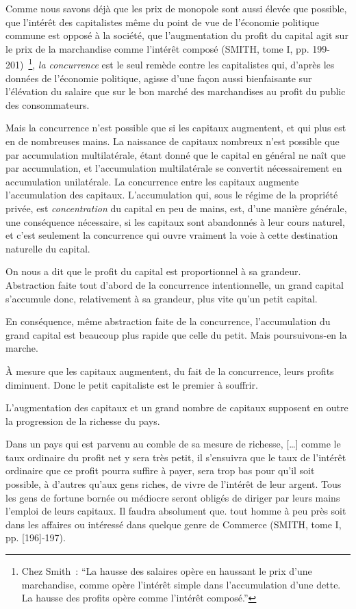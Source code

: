 \documentclass[french,twoside]{book} %
\newenvironment{quoteblock}%
  {\begin{quoting}}
  {\end{quoting}}
\newenvironment{quotebar}{%
    \def\FrameCommand{{\color{rubric!10!}\vrule width 0.5em} \hspace{0.9em}}%
    \def\OuterFrameSep{\itemsep} %
    \MakeFramed {\advance\hsize-\width \FrameRestore}
  }%
  {%
    \endMakeFramed
  }
\renewenvironment{quoteblock}%
  {%
    \savenotes
    \setstretch{0.9}
    \normalfont
    \begin{quotebar}
  }
  {%
    \end{quotebar}
    \spewnotes
  }
\begin{document}
\noindent Comme nous savons déjà que les prix de monopole sont aussi élevée que possible, que l’intérêt des capitalistes même du point de vue de l’économie politique commune est opposé à la société, que l’augmentation du profit du capital agit sur le prix de la marchandise comme l’intérêt composé (SMITH, tome I, pp. 199-201) \footnote{Chez Smith : “La hausse des salaires opère en haussant le prix d’une marchandise, comme opère l’intérêt simple dans l’accumulation d’une dette. La hausse des profits opère comme l’intérêt composé.”}, \emph{la concurrence} est le seul remède contre les capitalistes qui, d’après les données de l’économie politique, agisse d’une façon aussi bienfaisante sur l’élévation du salaire que sur le bon marché des marchandises au profit du public des consommateurs.\par
Mais la concurrence n’est possible que si les capitaux augmentent, et qui plus est en de nombreuses mains. La naissance de capitaux nombreux n’est possible que par accumulation multilatérale, étant donné que le capital en général ne naît que par accumulation, et l’accumulation multilatérale se convertit nécessairement en accumulation unilatérale. La concurrence entre les capitaux augmente l’accumulation des capitaux. L’accumulation qui, sous le régime de la propriété privée, est \emph{concentration} du capital en peu de mains, est, d’une manière générale, une conséquence nécessaire, si les capitaux sont abandonnés à leur cours naturel, et c’est seulement la concurrence qui ouvre vraiment la voie à cette destination naturelle du capital.\par
On nous a dit que le profit du capital est proportionnel à sa grandeur. Abstraction faite tout d’abord de la concurrence intentionnelle, un grand capital s’accumule donc, relativement à sa grandeur, plus vite qu’un petit capital.\par
[VIII] En conséquence, même abstraction faite de la concurrence, l’accumulation du grand capital est beaucoup plus rapide que celle du petit. Mais poursuivons-en la marche.\par
À mesure que les capitaux augmentent, du fait de la concurrence, leurs profits diminuent. Donc le petit capitaliste est le premier à souffrir.\par
L’augmentation des capitaux et un grand nombre de capitaux supposent en outre la progression de la richesse du pays.\par

\begin{quoteblock}
 \noindent Dans un pays qui est parvenu au comble de sa mesure de richesse, […] comme le taux ordinaire du profit net y sera très petit, il s’ensuivra que le taux de l’intérêt ordinaire que ce profit pourra suffire à payer, sera trop bas pour qu’il soit possible, à d’autres qu’aux gens riches, de vivre de l’intérêt de leur argent. Tous les gens de fortune bornée ou médiocre seront obligés de diriger par leurs mains l’emploi de leurs capitaux. Il faudra absolument que. tout homme à peu près soit dans les affaires ou intéressé dans quelque genre de Commerce (SMITH, tome I, pp. [196]-197).
 \end{quoteblock}
\end{document}
